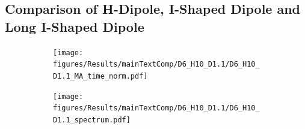 \subsection{Comparison of H-Dipole, I-Shaped Dipole and Long I-Shaped Dipole}

\begin{figure}[ht]
    \centering
    \begin{subfigure}[b]{0.49\textwidth}
        \centering
        \texttt{[image: figures/Results/mainTextComp/D6\_H10\_D1.1/D6\_H10\_D1.1\_MA\_time\_norm.pdf]}
        \caption{\centering}
    \end{subfigure}
    \hfill
    \begin{subfigure}[b]{0.49\textwidth}
        \centering
        \texttt{[image: figures/Results/mainTextComp/D6\_H10\_D1.1/D6\_H10\_D1.1\_spectrum.pdf]}
        \caption{\centering}
    \end{subfigure}
    \caption{}
\end{figure}